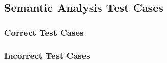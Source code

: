 
\subsection{Semantic Analysis Test Cases}
\label{app:semantic/testcases}

\subsubsection{Correct Test Cases}
\label{app:semantic/correct}




\clearpage %

\subsubsection{Incorrect Test Cases}
\label{app:semantic/incorrect}



%
%
